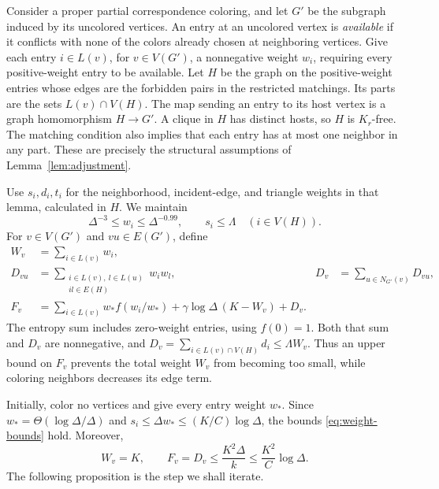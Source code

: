 Consider a proper partial correspondence coloring, and let $G'$ be the
subgraph induced by its uncolored vertices.  An entry at an uncolored
vertex is \emph{available} if it conflicts with none of the colors already
chosen at neighboring vertices.  Give each entry $i\in L(v)$, for
$v\in V(G')$, a nonnegative weight $w_i$, requiring every positive-weight
entry to be available.  Let $H$ be the graph on the positive-weight
entries whose edges are the forbidden pairs in the restricted matchings.
Its parts are the sets $L(v)\cap V(H)$.  The map sending an entry to its
host vertex is a graph homomorphism $H\to G'$.  A clique in $H$ has
distinct hosts, so $H$ is $K_r$-free.  The matching condition also implies
that each entry has at most one neighbor in any part.  These are precisely
the structural assumptions of Lemma~\ref{lem:adjustment}.

Use $s_i,d_i,t_i$ for the neighborhood, incident-edge, and triangle
weights in that lemma, calculated in $H$.  We maintain
\begin{equation}\label{eq:weight-bounds}
 \Delta^{-3}\le w_i\le\Delta^{-0.99},\qquad s_i\le\Lambda
 \quad (i\in V(H)).
\end{equation}
For $v\in V(G')$ and $vu\in E(G')$, define
\begin{equation}\label{eq:vertex-potentials}
 \begin{aligned}
 W_v&=\sum_{i\in L(v)}w_i,\\
 D_{vu}&=\sum_{\substack{i\in L(v),\ l\in L(u)\\il\in E(H)}}w_iw_l,
 &D_v&=\sum_{u\in N_{G'}(v)}D_{vu},\\
 F_v&=\sum_{i\in L(v)}w_*f(w_i/w_*)
       +\gamma\log\Delta\,(K-W_v)+D_v.
 \end{aligned}
\end{equation}
The entropy sum includes zero-weight entries, using $f(0)=1$.
Both that sum and $D_v$ are nonnegative, and
$D_v=\sum_{i\in L(v)\cap V(H)}d_i\le\Lambda W_v$.
Thus an upper bound on $F_v$ prevents the total weight $W_v$ from
becoming too small, while coloring neighbors decreases its edge term.

Initially, color no vertices and give every entry weight $w_*$.  Since
$w_*=\Theta(\log\Delta/\Delta)$ and
$s_i\le\Delta w_*\le(K/C)\log\Delta$, the bounds
\eqref{eq:weight-bounds} hold.  Moreover,
\begin{equation}\label{eq:initial-state}
 W_v=K,\qquad F_v=D_v\le \frac{K^2\Delta}{k}
                         \le\frac{K^2}{C}\log\Delta.
\end{equation}
The following proposition is the step we shall iterate.

